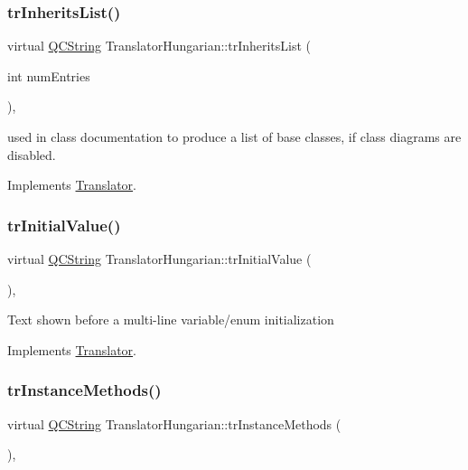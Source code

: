 \subsubsection{\texorpdfstring{trInheritsList()}{trInheritsList()}}
{\footnotesize\ttfamily virtual \mbox{\hyperlink{class_q_c_string}{Q\+C\+String}} Translator\+Hungarian\+::tr\+Inherits\+List (\begin{DoxyParamCaption}\item[{int}]{num\+Entries }\end{DoxyParamCaption})\hspace{0.3cm}{\ttfamily [inline]}, {\ttfamily [virtual]}}

used in class documentation to produce a list of base classes, if class diagrams are disabled. 

Implements \mbox{\hyperlink{class_translator}{Translator}}.

\mbox{\label{class_translator_hungarian_a1016eee29baa71400a332e85ba2a25e5}} 
\subsubsection{\texorpdfstring{trInitialValue()}{trInitialValue()}}
{\footnotesize\ttfamily virtual \mbox{\hyperlink{class_q_c_string}{Q\+C\+String}} Translator\+Hungarian\+::tr\+Initial\+Value (\begin{DoxyParamCaption}{ }\end{DoxyParamCaption})\hspace{0.3cm}{\ttfamily [inline]}, {\ttfamily [virtual]}}

Text shown before a multi-\/line variable/enum initialization 

Implements \mbox{\hyperlink{class_translator}{Translator}}.

\mbox{\label{class_translator_hungarian_aeed59f04bccf097ee35a2111393d2895}} 
\subsubsection{\texorpdfstring{trInstanceMethods()}{trInstanceMethods()}}
{\footnotesize\ttfamily virtual \mbox{\hyperlink{class_q_c_string}{Q\+C\+String}} Translator\+Hungarian\+::tr\+Instance\+Methods (\begin{DoxyParamCaption}{ }\end{DoxyParamCaption})\hspace{0.3cm}{\ttfamily [inline]}, {\ttfamily [virtual]}}

